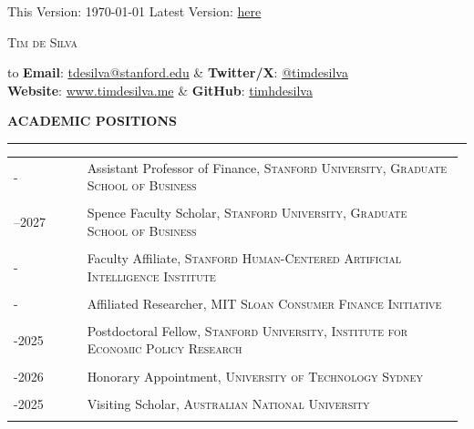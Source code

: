 \documentclass[a4paper, 10pt]{article}
\makeatletter
\newcommand{\cvsec}[1]
{
	\needspace{4\baselineskip}
	\noindent \textbf{#1}
	
	\vspace{2pt}
	
	\hrule
	
	\bigskip
}
\newcommand{\cvitem}[2]{#1 & #2 \\ & \\}
\newenvironment{cvchrono}[1]
{
	\cvsec{#1}
	\begin{longtable}{@{}>{\raggedright\arraybackslash}p{0.16\linewidth}@{\hspace{0.02\linewidth}}>{\raggedright\arraybackslash}p{0.82\linewidth}@{}}
}
{
	\end{longtable}
}
\makeatother
\begin{document}
\begin{flushright}
	This Version: \today{}
	\vskip 0.01cm 
	Latest Version: \href{https://www.timdesilva.me/files/cv.pdf}{here}
\end{flushright}

\bigskip

\begin{center}
	\huge \textsc{Tim de Silva}
\end{center}

\bigskip \bigskip

\begin{tabu} to \linewidth {X[l]X[r]}
	 \textbf{Email}: \href{mailto:tdesilva@stanford.edu}{tdesilva@stanford.edu} & \textbf{Twitter/X}: \href{https://twitter.com/timdesilva}{@timdesilva} \\
	\textbf{Website}: \href{http://www.timdesilva.me}{www.timdesilva.me} & \textbf{GitHub}: \href{https://github.com/timhdesilva}{timhdesilva} \\
\end{tabu}

\bigskip \bigskip

\begin{cvchrono}{ACADEMIC POSITIONS}
	\cvitem{2025-}{Assistant Professor of Finance, {\scshape Stanford University, Graduate School of Business}}
	\cvitem{2026--2027}{Spence Faculty Scholar, {\scshape Stanford University, Graduate School of Business}}
	\cvitem{2025-}{Faculty Affiliate, {\scshape Stanford Human-Centered Artificial Intelligence Institute}}
	\cvitem{2025-}{Affiliated Researcher, \textsc{MIT Sloan Consumer Finance Initiative}}
	\cvitem{2024-2025}{Postdoctoral Fellow, \textsc{Stanford University, Institute for Economic Policy Research}}
	\cvitem{2022-2026}{Honorary Appointment, \textsc{University of Technology Sydney}}
	\cvitem{2022-2025}{Visiting Scholar, \textsc{Australian National University}}
\end{cvchrono}
\end{document}
